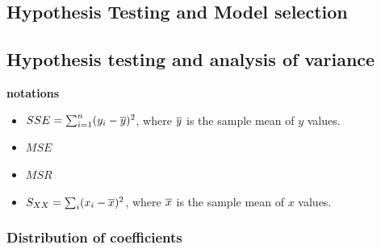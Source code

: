 \begin{refsection}
\section{Hypothesis Testing and Model selection}

\subsection{Hypothesis testing and analysis of variance}
\begin{mdframed}
	\textbf{notations}
	\begin{itemize}
		\item $SSE = \sum_{i=1}^n (y_i - \overline{y})^2$, where $\overline{y}$ is the sample mean of $y$ values.
		\item $MSE$
		\item $MSR$
		\item $S_{XX} = \sum_i (x_{i}-\overline{x})^2$, where $\overline{x}$ is the sample mean of $x$ values.
	\end{itemize}
\end{mdframed}

\subsubsection{Distribution of coefficients}


\end{refsection}

